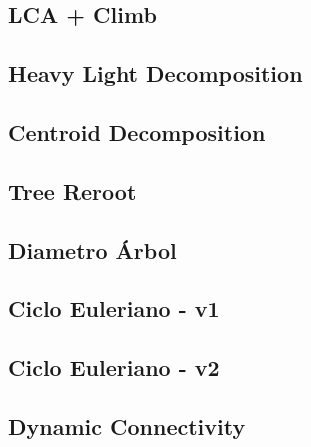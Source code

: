 \subsection{LCA + Climb}


\subsection{Heavy Light Decomposition}

\subsection{Centroid Decomposition}


\subsection{Tree Reroot}


\subsection{Diametro \'Arbol}


\subsection{Ciclo Euleriano - v1}

\subsection{Ciclo Euleriano - v2}


\subsection{Dynamic Connectivity}

